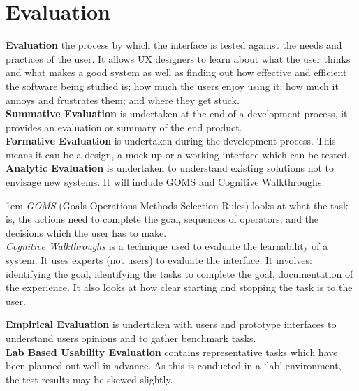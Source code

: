 \documentclass[a4paper,11pt]{article}
\begin{document}
\section{Evaluation}
\textbf{Evaluation} the process by which the interface is tested against the needs and practices of the user. It allows UX designers to learn about what the user thinks and what makes a good system as well as finding out how effective and efficient the software being studied is; how much the users enjoy using it; how much it annoys and frustrates them; and where they get stuck.\\
\textbf{Summative Evaluation} is undertaken at the end of a development process, it provides an evaluation or summary of the end product.\\
\textbf{Formative Evaluation} is undertaken during the development process. This means it can be a design, a mock up or a working interface which can be tested.\\
\textbf{Analytic Evaluation} is undertaken to understand existing solutions not to envisage new systems. It will include GOMS and Cognitive Walkthroughs
\begin{adjustwidth}{2em} {1em}
\textit{GOMS} (Goals Operations Methods Selection Rules) looks at what the task is, the actions need to complete the goal, sequences of operators, and the decisions which the user has to make.\\
\textit{Cognitive Walkthroughs} is a technique used to evaluate the learnability of a system. It uses experts (not users) to evaluate the interface. It involves: identifying the goal, identifying the tasks to complete the goal, documentation of the experience. It also looks at how clear starting and stopping the task is to the user.
\end{adjustwidth}
\textbf{Empirical Evaluation} is undertaken with users and prototype interfaces to understand users opinions and to gather benchmark tasks.\\
\textbf{Lab Based Usability Evaluation} contains representative tasks which have been planned out well in advance. As this is conducted in a `lab' environment, the test results may be skewed slightly.
\end{document}
